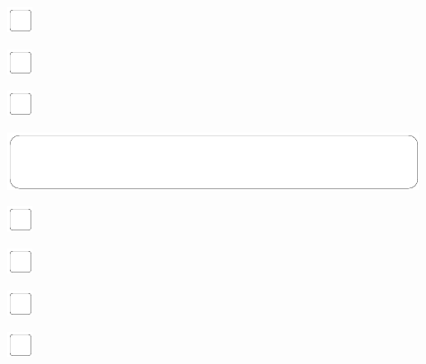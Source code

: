 \documentclass[11pt,titlepage]{article}
\begin{document}
\noindent
\includegraphics[]{checkbox-4mm.pdf}

\vspace{10mm}

\noindent
\includegraphics[]{checkbox-4mm.pdf}

\vspace{10mm}

\noindent
\includegraphics[]{checkbox-4mm.pdf}

\pagebreak

\small
\hfill

\vspace{6mm}

\noindent
\includegraphics[]{mediumbox.pdf}

\vspace{15mm}

\noindent
\includegraphics[]{checkbox-4mm.pdf}

\vspace{10mm}

\noindent
\includegraphics[]{checkbox-4mm.pdf}

\vspace{10mm}

\noindent
\includegraphics[]{checkbox-4mm.pdf}

\vspace{10mm}

\noindent
\includegraphics[]{checkbox-4mm.pdf}
\end{document}
